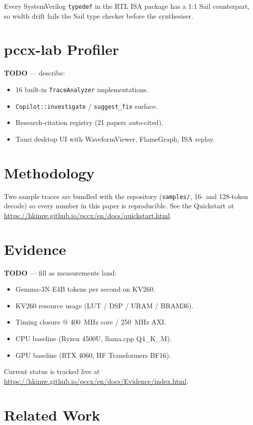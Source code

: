\documentclass[11pt,a4paper]{article}
\begin{document}
Every SystemVerilog \texttt{typedef} in the RTL ISA package has a
1:1 Sail counterpart, so width drift fails the Sail type checker
before the synthesiser.

\section{pccx-lab Profiler}
\label{sec:lab}

\textbf{TODO} — describe:
\begin{itemize}
  \item 16 built-in \texttt{TraceAnalyzer} implementations.
  \item \texttt{Copilot::investigate} / \texttt{suggest\_fix} surface.
  \item Research-citation registry (21 papers auto-cited).
  \item Tauri desktop UI with WaveformViewer, FlameGraph, ISA replay.
\end{itemize}

\section{Methodology}
\label{sec:method}

Two sample traces are bundled with the repository
(\texttt{samples/}, 16- and 128-token decode) so every number in this
paper is reproducible.  See the Quickstart at
\url{https://hkimw.github.io/pccx/en/docs/quickstart.html}.

\section{Evidence}
\label{sec:evidence}

\textbf{TODO} — fill as measurements land:
\begin{itemize}
  \item Gemma-3N E4B tokens per second on KV260.
  \item KV260 resource usage (LUT / DSP / URAM / BRAM36).
  \item Timing closure @ 400~MHz core / 250~MHz AXI.
  \item CPU baseline (Ryzen 4500U, llama.cpp Q4\_K\_M).
  \item GPU baseline (RTX 4060, HF Transformers BF16).
\end{itemize}

Current status is tracked live at
\url{https://hkimw.github.io/pccx/en/docs/Evidence/index.html}.

\section{Related Work}
\label{sec:related}
\end{document}
